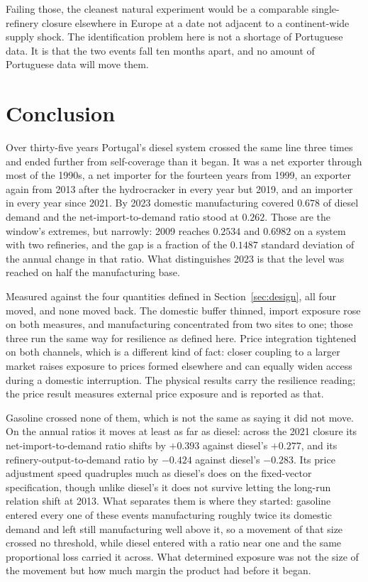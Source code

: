 \documentclass[11pt,a4paper]{article}
\begin{document}
Failing those, the cleanest natural experiment would be a comparable single-refinery closure
elsewhere in Europe at a date not adjacent to a continent-wide supply shock. The identification
problem here is not a shortage of Portuguese data. It is that the two events fall ten months
apart, and no amount of Portuguese data will move them.

\section{Conclusion}
\label{sec:conclusion}

Over thirty-five years Portugal's diesel system crossed the same line three times and ended
further from self-coverage than it began. It was a net exporter through most of the 1990s, a net
importer for the fourteen years from 1999, an exporter again from 2013 after the hydrocracker
in every year but 2019, and an importer in every year since 2021. By 2023 domestic manufacturing covered $0.678$ of
diesel demand and the net-import-to-demand ratio stood at $0.262$. Those are the window's
extremes, but narrowly: 2009 reaches $0.2534$ and $0.6982$ on a system with two refineries, and
the gap is a fraction of the $0.1487$ standard deviation of the annual change in that ratio.
What distinguishes 2023 is that the level was reached on half the manufacturing base.

Measured against the four quantities defined in Section~\ref{sec:design}, all four
moved, and none moved back. The domestic buffer thinned, import exposure rose on both measures,
and manufacturing concentrated from two sites to one; those three run the same way for
resilience as defined here. Price integration tightened on both channels, which is a different
kind of fact: closer coupling to a larger market raises exposure to prices formed elsewhere and
can equally widen access during a domestic interruption. The physical results carry the
resilience reading; the price result measures external price exposure and is reported as that.

Gasoline crossed none of them, which is not the same as saying it did not move. On the annual
ratios it moves at least as far as diesel: across the 2021 closure its net-import-to-demand
ratio shifts by $+0.393$ against diesel's $+0.277$, and its refinery-output-to-demand ratio by
$-0.424$ against diesel's $-0.283$. Its price adjustment speed quadruples much as diesel's
does on the fixed-vector specification, though unlike diesel's it does not survive letting the
long-run relation shift at 2013. What separates them is where they started: gasoline entered every one of these events
manufacturing roughly twice its domestic demand and left still manufacturing well above it, so
a movement of that size crossed no threshold, while diesel entered with a ratio near one and
the same proportional loss carried it across. What determined exposure was not the size of the
movement but how much margin the product had before it began.
\end{document}
